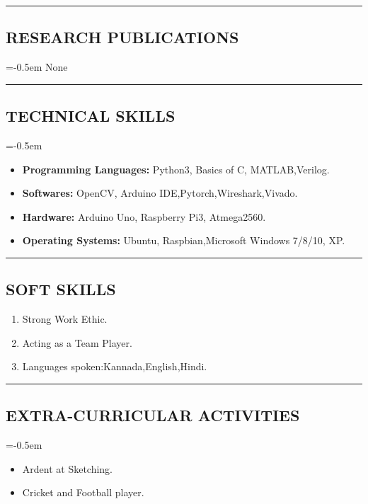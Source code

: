 \documentclass[10pt,letterpaper]{article}
\begin{document}
\hrule
\subsection*{RESEARCH PUBLICATIONS}
\parskip=-0.5em
None

\vspace{1.0em}
\hrule
\subsection*{TECHNICAL SKILLS}
\parskip=-0.5em

\begin{itemize}

    \item \textbf{Programming Languages:} Python3, Basics of C, MATLAB,Verilog.
    \item \textbf{Softwares:} OpenCV, Arduino IDE,Pytorch,Wireshark,Vivado.
    \item \textbf{Hardware:}  Arduino Uno, Raspberry Pi3, Atmega2560.
    \item \textbf{Operating Systems:} Ubuntu, Raspbian,Microsoft Windows 7/8/10, XP.

\end{itemize}

\hrule
\subsection*{SOFT SKILLS}

\begin{enumerate}

	\item Strong Work Ethic.
	\item Acting as a Team Player.
	\item Languages spoken:Kannada,English,Hindi.

\end{enumerate}

\hrule
\subsection*{EXTRA-CURRICULAR ACTIVITIES}
\parskip=-0.5em

\begin{itemize}

	\item Ardent at Sketching.
	\item Cricket and Football player.

\end{itemize}
\end{document}
